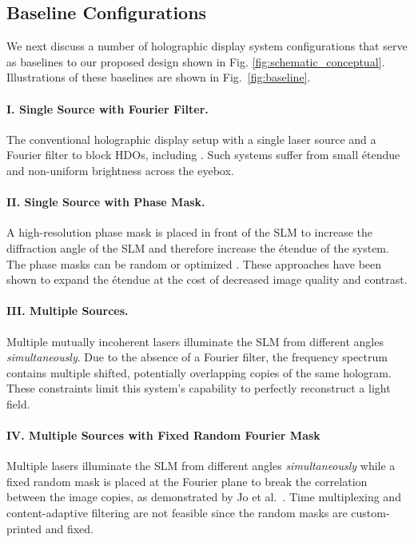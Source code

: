\subsection{Baseline Configurations}

We next discuss a number of holographic display system configurations that serve as baselines to our proposed design shown in Fig. \ref{fig:schematic_conceptual}. Illustrations of these baselines are shown in Fig.~\ref{fig:baseline}.

\paragraph{I. Single Source with Fourier Filter.} The conventional holographic display setup with a single laser source and a Fourier filter to block HDOs, including \cite{peng2020neural, shi2021neural, choi2022flex, maimone2017holo}. Such systems suffer from small \'etendue and non-uniform brightness across the eyebox.

\paragraph{II. Single Source with Phase Mask.} A high-res\-o\-lu\-tion phase mask is placed in front of the SLM to increase the diffraction angle of the SLM and therefore increase the \'etendue of the system. The phase masks can be random \cite{kuo2020mask, buckley2006mask, park2019photon, yu2017speckle} or optimized \cite{tseng2023neural,monin2022mask}. These approaches have been shown to expand the \'etendue at the cost of decreased image quality and contrast.


\paragraph{III. Multiple Sources.} Multiple mutually incoherent lasers illuminate the SLM from different angles \emph{simultaneously}. Due to the absence of a Fourier filter, the frequency spectrum contains multiple shifted, potentially overlapping copies of the same hologram. These constraints limit this system's capability to perfectly reconstruct a light field.


\paragraph{IV. Multiple Sources with Fixed Random Fourier Mask} Multiple lasers illuminate the SLM from different angles \emph{simultaneously} while a fixed random mask is placed at the Fourier plane to break the correlation between the image copies, as demonstrated by Jo et al.~. Time multiplexing and content-adaptive filtering are not feasible since the random masks are custom-printed and fixed.




